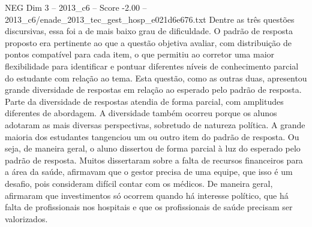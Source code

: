 \begin{textsample}{NEG Dim 3 – 2013\_c6 – Score -2.00 – 2013\_c6/enade\_2013\_tec\_gest\_hosp\_e021d6e676.txt}
Dentre as três questões discursivas, essa foi a de mais baixo grau de dificuldade.
O padrão de resposta proposto era pertinente ao que a questão objetiva avaliar, com distribuição de pontos compatível para cada item, o que permitiu ao corretor uma maior flexibilidade para identificar e pontuar diferentes níveis de conhecimento parcial do estudante com relação ao tema.
Esta questão, como as outras duas, apresentou grande diversidade de respostas em relação ao esperado pelo padrão de resposta.
Parte da diversidade de respostas atendia de forma parcial, com amplitudes diferentes de abordagem.
A diversidade também ocorreu porque os alunos adotaram as mais diversas perspectivas, sobretudo de natureza política.
A grande maioria dos estudantes tangenciou um ou outro item do padrão de resposta.
Ou seja, de maneira geral, o aluno dissertou de forma parcial à luz do esperado pelo padrão de resposta.
Muitos dissertaram sobre a falta de recursos financeiros para a área da saúde, afirmavam que o gestor precisa de uma equipe, que isso é um desafio, pois consideram difícil contar com os médicos.
De maneira geral, afirmaram que investimentos só ocorrem quando há interesse político, que há falta de profissionais nos hospitais e que os profissionais de saúde precisam ser valorizados.

\end{textsample}
